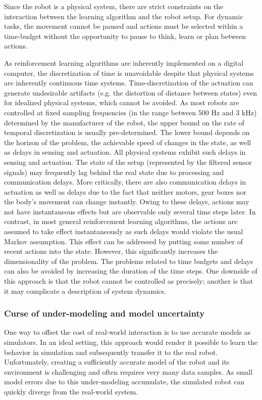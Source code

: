 Since the robot is a physical system, there are strict constraints on the interaction between the learning algorithm
and the robot setup. For dynamic tasks, the movement cannot be paused and actions must be selected within a time-budget without 
the opportunity to pause to think, learn or plan between actions.

As reinforcement learning algorithms are inherently implemented on a digital computer, the discretization of
time is unavoidable despite that physical systems are inherently continuous time systems. Time-discretization of the
actuation can generate undesirable artifacts (e.g. the distortion of distance between states) even for idealized physical
systems, which cannot be avoided. As most robots are controlled at fixed sampling frequencies (in the range between
500 Hz and 3 kHz) determined by the manufacturer of the robot, the upper bound on the rate of temporal discretization
is usually pre-determined. The lower bound depends on the horizon of the problem, the achievable speed of changes in
the state, as well as delays in sensing and actuation. All physical systems exhibit such delays in sensing and
actuation. The state of the setup (represented by the filtered sensor signals) may frequently lag behind the real state due
to processing and communication delays. More critically, there are also communication delays in actuation as well
as delays due to the fact that neither motors, gear boxes nor the body's movement can change instantly. Owing to
these delays, actions may not have instantaneous effects but are observable only several time steps later. In contrast, 
in most general reinforcement learning algorithms, the actions are assumed to take effect instantaneously as such
delays would violate the usual Markov assumption. This effect can be addressed by putting some number of recent
actions into the state. However, this significantly increases the dimensionality of the problem.
The problems related to time budgets and delays can also be avoided by increasing the duration of the time steps.
One downside of this approach is that the robot cannot be controlled as precisely; another is that it may complicate a
description of system dynamics.

\subsubsection{Curse of under-modeling and model uncertainty}
One way to offset the cost of real-world interaction is to use accurate models as simulators. In an ideal setting, this
approach would render it possible to learn the behavior in simulation and subsequently transfer it to the real robot.
Unfortunately, creating a sufficiently accurate model of the robot and its environment is challenging and often requires
very many data samples. As small model errors due to this under-modeling accumulate, the simulated robot can
quickly diverge from the real-world system.

